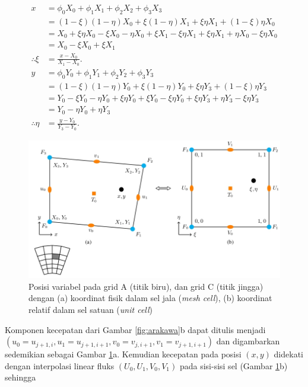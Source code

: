 \begin{spacing}{1.5}
	\begin{equation*}
		\begin{aligned}
			x &= \phi_0 X_0 + \phi_1 X_1 + \phi_2 X_2 + \phi_3 X_3 \\
			&= (1-\xi)(1-\eta)X_0+\xi(1-\eta)X_1+\xi\eta X_1 +(1-\xi)\eta X_0 \\
			&= X_0 + \xi\eta X_0 - \xi X_0 - \eta X_0 + \xi X_1 - \xi\eta X_1 + \xi\eta X_1 + \eta X_0 - \xi\eta X_0 \\
			&= X_0 - \xi X_0 + \xi X_1 \\
			\therefore \xi &= \frac{x-X_0}{X_1-X_0}. \\
			y &= \phi_0 Y_0 + \phi_1 Y_1 + \phi_2 Y_2 + \phi_3 Y_3 \\
			&= (1-\xi)(1-\eta)Y_0+\xi(1-\eta)Y_0+\xi\eta Y_3 +(1-\xi)\eta Y_3 \\
			&= Y_0 - \xi Y_0 - \eta Y_0 + \xi\eta Y_0 + \xi Y_0 - \xi\eta Y_0 + \xi\eta Y_3 + \eta Y_3 - \xi\eta Y_3 \\
			&= Y_0 - \eta Y_0 + \eta Y_3\\
			\therefore \eta &= \frac{y-Y_0}{Y_3-Y_0}. 
		\end{aligned}
	\end{equation*}
	\begin{figure}[H]
		\centering
		\includegraphics[width=13cm]{contents/mesh_arakawa.jpg}
		\caption{Posisi variabel pada grid A (titik biru), dan grid C (titik jingga) dengan (a) koordinat fisik dalam sel jala (\textit{mesh cell}), (b) koordinat relatif dalam sel satuan (\textit{unit cell}) \protect{}}
		\label{fig:mesh}
	\end{figure}
	Komponen kecepatan dari Gambar \ref{fig:arakawa}b dapat ditulis menjadi $(u_0=u_{j+1,i}, u_1=u_{j+1,i+1}, v_0=v_{j,i+1}, v_1=v_{j+1,i+1})$ dan digambarkan sedemikian sebagai Gambar \ref{fig:mesh}a. Kemudian kecepatan pada posisi $(x,y)$ didekati dengan interpolasi linear fluks $(U_0,U_1,V_0,V_1)$ pada sisi-sisi sel (Gambar \ref{fig:mesh}b) sehingga

\end{spacing}

